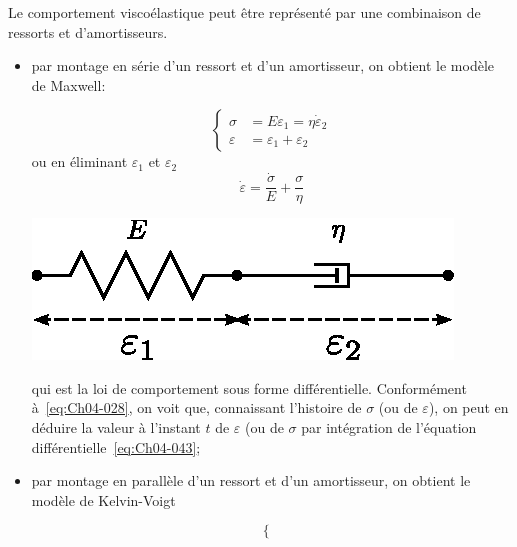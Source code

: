 Le comportement viscoélastique peut être représenté par une combinaison de ressorts et d'amortisseurs. 
\begin{itemize}
    \item par montage en série d'un ressort et d'un amortisseur, on obtient le modèle de Maxwell:
        \begin{multicols}{2}
            \begin{equation}
                \left\{
                \begin{aligned}
                    \sigma &= E \varepsilon_1 = \eta \dot{\varepsilon}_2 \\
                    \varepsilon &= \varepsilon_1 + \varepsilon_2
                \end{aligned}
                \right.
                \label{eq:Ch04-042}
            \end{equation}
            ou en éliminant $\varepsilon_1$ et $\varepsilon_2$
            \begin{equation}
                \dot \varepsilon = \frac{\dot \sigma}{E} + \frac{\sigma}{\eta}
                \label{eq:Ch04-043}
            \end{equation}
            \columnbreak
            \begin{center}
                \includegraphics{../images/T1_Ch04-0025}
            \end{center}
        \end{multicols}
        qui est la loi de comportement sous forme différentielle.
        Conformément à~\eqref{eq:Ch04-028}, on voit que, connaissant l'histoire de $\sigma$ (ou de $\varepsilon$), on peut en déduire la valeur à l'instant $t$ de $\varepsilon$ (ou de $\sigma$ par intégration de l'équation différentielle~\eqref{eq:Ch04-043};
    \item par montage en parallèle d'un ressort et d'un amortisseur, on obtient le modèle de Kelvin-Voigt
        \begin{multicols}{2}
            \begin{equation}
                \left\{
                \begin{aligned}

\end{aligned}
\end{equation}
\end{multicols}
\end{itemize}
